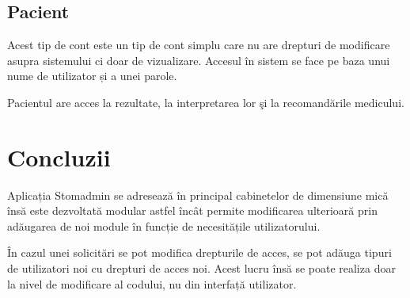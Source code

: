 \documentclass[a4paper,12pt]{article}
\begin{document}
\subsection{Pacient}

Acest tip de cont este un tip de cont simplu care nu are drepturi de modificare asupra sistemului ci doar de vizualizare. Accesul în sistem se face pe baza unui nume de utilizator și a unei parole.

Pacientul are acces la rezultate, la interpretarea lor şi la recomandările medicului.

\section{Concluzii}

Aplicația Stomadmin se adresează în principal cabinetelor de dimensiune mică însă este dezvoltată modular astfel încât permite modificarea ulterioară prin adăugarea de noi module în funcție de necesitățile utilizatorului.

În cazul unei solicitări se pot modifica drepturile de acces, se pot adăuga tipuri de utilizatori noi cu drepturi de acces noi. Acest lucru însă se poate realiza doar la nivel de modificare al codului, nu din interfață utilizator.
\end{document}
